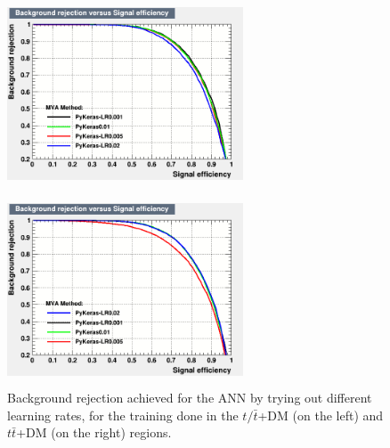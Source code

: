 \documentclass[a4paper, 10pt, openright]{report}
\begin{document}
\begin{appendices}

\begin{figure}[htbp]
\centering
\begin{minipage}[b]{.48\textwidth}
\includegraphics[width=7cm, height=5.7cm]{figs/ANN_LR_ST.png}
\end{minipage}\hfill
\begin{minipage}[b]{.48\textwidth}
\includegraphics[width=7cm, height=5.7cm]{figs/ANN_LR_TTbar.png}
\end{minipage} \hfill
\caption{Background rejection achieved for the \ac{ANN} by trying out different learning rates, for the training done in the $t/ \bar t$+DM (on the left) and $t \bar t$+DM (on the right) regions.}
\label{fig:optLearning}
\end{figure}


\end{appendices}
\end{document}
